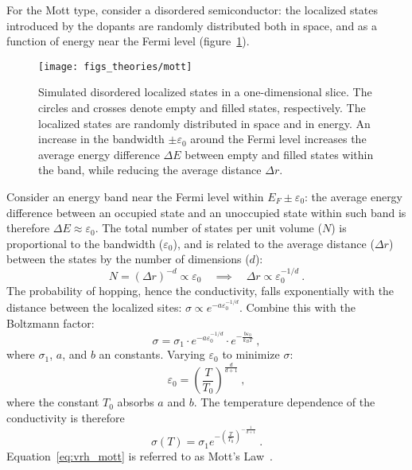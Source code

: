 For the Mott type, consider a disordered semiconductor: the localized states introduced by the dopants are randomly distributed both in space, and as a function of energy near the Fermi level (figure~\ref{fig:mott}). %
\begin{figure}[ht]%
    \centering%
    \texttt{[image: figs\_theories/mott]}%
    \caption[Simulated disordered localized states]{\label{fig:mott}Simulated disordered localized states in a one-dimensional slice. The circles and crosses denote empty and filled states, respectively. The localized states are randomly distributed in space and in energy. An increase in the bandwidth $\pm\varepsilon_0$ around the Fermi level increases the average energy difference $\Delta E$ between empty and filled states within the band, while reducing the average distance $\Delta r$.}%
\end{figure}%
%
Consider an energy band near the Fermi level within $E_F \pm \varepsilon_0$: the average energy difference between an occupied state and an unoccupied state within such band is therefore $\Delta E \approx \varepsilon_0$. The total number of states per unit volume ($N$) is proportional to the bandwidth ($\varepsilon_0$), and is related to the average distance ($\Delta r$) between the states by the number of dimensions ($d$):%
\begin{equation}%
    N = (\Delta r)^{-d} \propto \varepsilon_0 \quad \implies \quad \Delta r \propto \varepsilon_0^{-1/d}~.%
\end{equation}%
The probability of hopping, hence the conductivity, falls exponentially with the distance between the localized sites: $\sigma \propto e^{-a\varepsilon_0^{-1/d}}$. Combine this with the Boltzmann factor:%
\begin{equation}%
    \sigma = \sigma_1 \cdot e^{-a\varepsilon_0^{-1/d}} \cdot e^{-\frac{b\varepsilon_0}{k_B T}}~,\label{eq:vrh_parts}%
\end{equation}%
where $\sigma_1$, $a$, and $b$ an constants. Varying $\varepsilon_0$ to minimize $\sigma$:%
\begin{equation}%
    \varepsilon_0 = \left(\frac{T}{T_0}\right)^{\frac{d}{d+1}}~,%
\end{equation}%
where the constant $T_0$ absorbs $a$ and $b$. The temperature dependence of the conductivity is therefore%
\begin{equation}%
    \sigma(T) = \sigma_1 e^{-\left(\frac{T}{T_0}\right)^{-\frac{1}{d+1}}}~.\label{eq:vrh_mott}%
\end{equation}%
Equation~\ref{eq:vrh_mott} is referred to as Mott's Law~\cite{schklovskii_efros, mott1968}.

